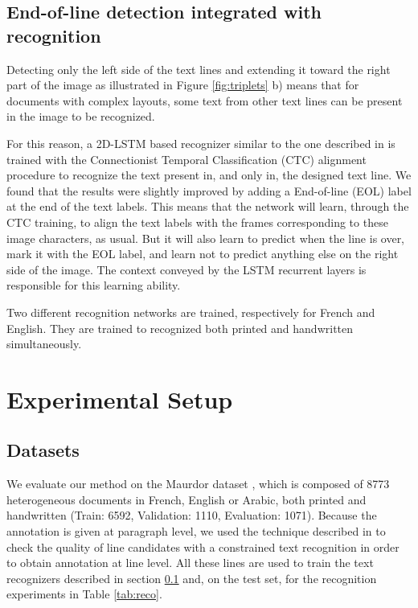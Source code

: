 \documentclass[conference]{IEEEtran}
\begin{document}
\subsection{End-of-line detection integrated with recognition}
\label{sec:recognizer}
Detecting only the left side of the text lines and extending it toward the right part of the image as illustrated in Figure \ref{fig:triplets} b) means that for documents with complex layouts, some text from other text lines can be present in the image to be recognized.

For this reason, a 2D-LSTM based recognizer similar to the one described in \cite{pham2014dropout} is trained with the Connectionist Temporal Classification \cite{Graves06connectionisttemporal} (CTC) alignment procedure to recognize the text present in, and only in, the designed text line. We found that the results were slightly improved by adding a End-of-line (EOL) label at the end of the text labels. 
This  means that the network will learn, through the CTC training, to align the text labels with the frames corresponding to these image characters, as usual. But it will also learn to predict when the line is over, mark it with the EOL label, and learn  not to predict anything else on the right side of the image. The context conveyed by the LSTM recurrent layers is responsible for this learning ability.

Two different recognition networks are trained, respectively for French and English. They are trained to recognized both printed and handwritten simultaneously. 

\section{Experimental Setup}
\label{sec:experimental}
\subsection{Datasets}
We evaluate our method on the Maurdor dataset \cite{Brunessaux2014}, which is composed of 8773 heterogeneous documents in French, English or Arabic, both printed and handwritten (Train: 6592, Validation: 1110, Evaluation: 1071). Because the annotation is given at paragraph level, we used the technique described in \cite{bluche2014automatic} to check the quality of line candidates with a constrained text recognition in order to obtain annotation at line level. All these lines are used to train the text recognizers described in section \ref{sec:recognizer} and, on the test set, for the recognition experiments in Table \ref{tab:reco}.
\end{document}
